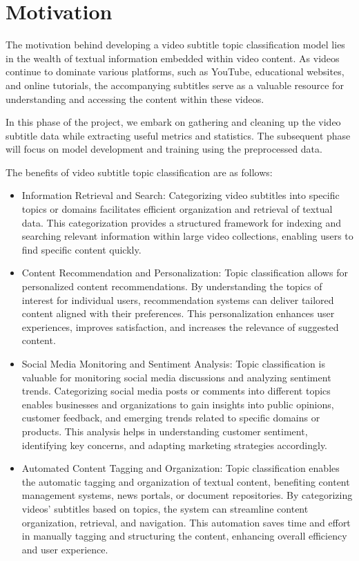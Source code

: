 \documentclass{article}
\begin{document}
\section{Motivation}
The motivation behind developing a video subtitle topic classification model lies in the wealth of textual information embedded within video content.
As videos continue to dominate various platforms, such as YouTube, educational websites, and online tutorials, the accompanying subtitles serve as a valuable resource for understanding and accessing the content within these videos.

In this phase of the project, we embark on gathering and cleaning up the video subtitle data while extracting useful metrics and statistics.
The subsequent phase will focus on model development and training using the preprocessed data.

The benefits of video subtitle topic classification are as follows:

\begin{itemize}
  \item Information Retrieval and Search: Categorizing video subtitles into specific topics or domains facilitates efficient organization and retrieval of textual data.
  This categorization provides a structured framework for indexing and searching relevant information within large video collections, enabling users to find specific content quickly.
  \item Content Recommendation and Personalization: Topic classification allows for personalized content recommendations.
  By understanding the topics of interest for individual users, recommendation systems can deliver tailored content aligned with their preferences. This personalization enhances user experiences, improves satisfaction, and increases the relevance of suggested content.
  \item Social Media Monitoring and Sentiment Analysis: Topic classification is valuable for monitoring social media discussions and analyzing sentiment trends.
  Categorizing social media posts or comments into different topics enables businesses and organizations to gain insights into public opinions, customer feedback, and emerging trends related to specific domains or products.
  This analysis helps in understanding customer sentiment, identifying key concerns, and adapting marketing strategies accordingly.
  \item Automated Content Tagging and Organization: Topic classification enables the automatic tagging and organization of textual content, benefiting content management systems, news portals, or document repositories.
  By categorizing videos' subtitles based on topics, the system can streamline content organization, retrieval, and navigation. This automation saves time and effort in manually tagging and structuring the content, enhancing overall efficiency and user experience.
\end{itemize}
\end{document}
